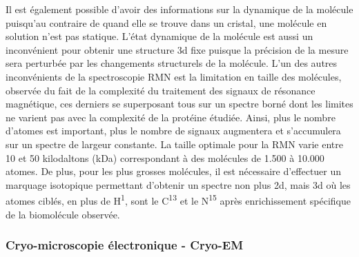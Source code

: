 Il est également possible d'avoir des informations sur la dynamique de la molécule puisqu'au contraire de quand elle se trouve dans un cristal, une molécule en solution n'est pas statique.
L'état dynamique de la molécule est aussi un inconvénient pour obtenir une structure 3d fixe puisque la précision de la mesure sera perturbée par les changements structurels de la molécule. L'un des autres inconvénients de la spectroscopie RMN est la limitation en taille des molécules, observée du fait de la complexité du traitement des signaux de résonance magnétique, ces derniers se superposant tous sur un spectre borné dont les limites ne varient pas avec la complexité de la protéine étudiée. Ainsi, plus le nombre d'atomes est important, plus le nombre de signaux augmentera et s'accumulera sur un spectre de largeur constante. La taille optimale pour la RMN varie entre 10 et 50 kilodaltons (kDa) correspondant à des molécules de 1.500 à 10.000 atomes. De plus, pour les plus grosses molécules, il est nécessaire d'effectuer un marquage isotopique permettant d'obtenir un spectre non plus 2d, mais 3d où les atomes ciblés, en plus de H\textsuperscript{1}, sont le C\textsuperscript{13} et le N\textsuperscript{15} après enrichissement spécifique de la biomolécule observée.


\subsubsection{Cryo-microscopie électronique - Cryo-EM}

